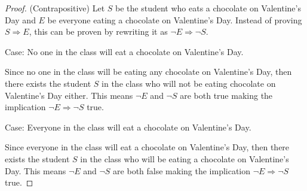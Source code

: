 \documentclass[11pt]{article}
\begin{document}
\begin{proof}
	(Contrapositive) Let $S$ be the student who eats a chocolate on Valentine's Day and $E$ be everyone eating a chocolate on Valentine's Day. Instead of proving $S\Rightarrow E$, this can be proven by rewriting it as $\lnot E \Rightarrow \lnot S$.

	Case: No one in the class will eat a chocolate on Valentine's Day.

	Since no one in the class will be eating any chocolate on Valentine's Day, then there exists the student $S$ in the class who will not be eating chocolate on Valentine's Day either. This means $\lnot E$ and $\lnot S$ are both true making the implication $\lnot E \Rightarrow \lnot S$ true.

	Case: Everyone in the class will eat a chocolate on Valentine's Day.

	Since everyone in the class will eat a chocolate on Valentine's Day, then there exists the student $S$ in the class who will be eating a chocolate on Valentine's Day. This means $\lnot E$ and $\lnot S$ are both false making the implication $\lnot E \Rightarrow \lnot S$ true.
\end{proof}


	
\end{document}
